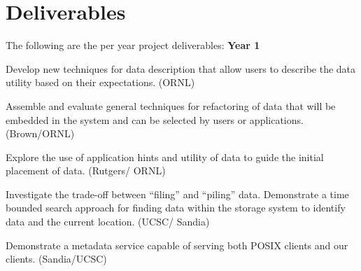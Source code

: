 \section{Deliverables}
The following are the per year project deliverables:
\small
\textbf{Year 1}
\begin{tightItemize}
\item Develop new techniques for data description that allow users to 
describe the data utility based on their expectations. (ORNL)

\item Assemble and evaluate general techniques for refactoring of data
that will be embedded in the system and can be selected by users or applications. (Brown/ORNL)
\item Explore the use of application hints and utility of data to guide the initial placement of data. 
(Rutgers/ ORNL)
\item Investigate the trade-off between ``filing'' and ``piling'' data. 
Demonstrate a time bounded search approach for finding data within the storage system
to identify data and the current location. (UCSC/ Sandia)
\item Demonstrate a metadata service capable of serving both POSIX clients and our clients. (Sandia/UCSC)
\end{tightItemize}

